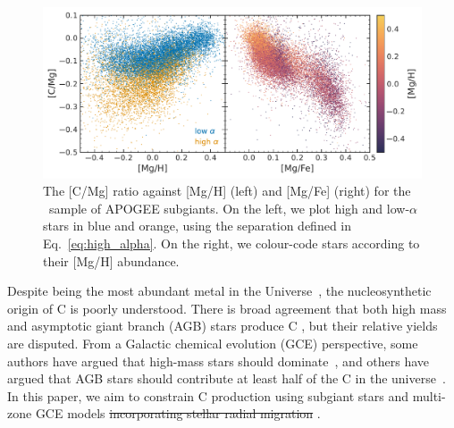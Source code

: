\documentclass[fleqn,
usenatbib]{mnras}
\newcommand{\apogee}{APOGEE}
\newcommand{\dbstrike}[1]{{\color{Thistle} \sout{#1} }}
\newcommand{\dbadd}[1]{{\color{Thistle} #1}}
\newcommand{\dbnote}[1]{ {\color{Thistle} \textit{\small (DB: #1)}} }
\begin{document}
\begin{figure}
    \centering
    \includegraphics{subgiants.pdf}
    \caption{The [C/Mg] ratio against [Mg/H] (left) and [Mg/Fe] (right) for the \citet{jack}~sample of \apogee{} subgiants. On the left, we plot high and low-$\alpha$ stars in blue and orange, using the separation defined in Eq.~\ref{eq:high_alpha}.  On the right, we colour-code stars according to their [Mg/H] abundance.} \label{fig:subgiants}
\end{figure}



Despite being the most abundant metal in the Universe~\citep[e.g.][]{magg+22}, the nucleosynthetic origin of C is poorly understood. 
There is broad agreement that both high mass and asymptotic giant branch (AGB) stars produce C \citep{jennifer19}, but their relative yields are disputed.
From a Galactic chemical evolution (GCE) perspective, some authors have argued that high-mass stars should dominate~\citep[e.g.][]{prantzos+94, HEK00, romano+20, franchini+20, gustafsson22}, and others have argued that AGB stars should contribute at least half of the C in the universe~\citep[e.g.][]{tinsley79, chiappini+03, mattsson10, KKU11, rybizki+17, KKL20}. 
In this paper, we aim to constrain C production using subgiant stars and multi-zone GCE models \dbstrike{incorporating stellar radial migration}.

\end{document}
